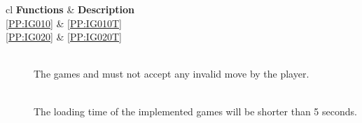 \begin{tabular}{{c}{l}}
    \hline
    {\bf Functions} & {\bf Description} \\ \hline
	\ref{PP:IG010} & \ref{PP:IG010T} \\ 
	\ref{PP:IG020} & \ref{PP:IG020T} \\ \hline
\end{tabular}

\vspace{.5cm}

\begin{description}
	\item[] \textbf{} \\
	The games \twixt and \graphcoloring must not accept any invalid move by the \gls{player}.
	\item[] \textbf{} \\
	The loading time of the implemented games will be shorter than 5 seconds. \\
\end{description}